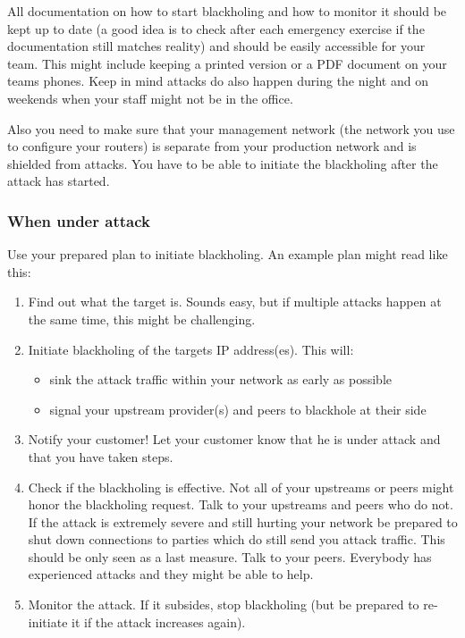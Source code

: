 All documentation on how to start blackholing and how to monitor it should be kept up to date (a good idea is to check after each emergency exercise if the documentation still matches reality) and should be easily accessible for your team. This might include keeping a printed version or a PDF document on your teams phones. Keep in mind attacks do also happen during the night and on weekends when your staff might not be in the office.

Also you need to make sure that your management network (the network you use to configure your routers) is separate from your production network and is shielded from attacks. You have to be able to initiate the blackholing after the attack has started.

\subsubsection{When under attack}
Use your prepared plan to initiate blackholing. An example plan might read like this:
\begin{enumerate}
\item Find out what the target is. Sounds easy, but if multiple attacks happen at the same time, this might be challenging.
\item Initiate blackholing of the targets IP address(es). This will:
\begin{itemize}
  \item sink the attack traffic within your network as early as possible
  \item signal your upstream provider(s) and peers to blackhole at their side
\end{itemize}
\item Notify your customer! Let your customer know that he is under attack and that you have taken steps.
\item Check if the blackholing is effective. Not all of your upstreams or peers might honor the blackholing request. Talk to your upstreams and peers who do not. If the attack is extremely severe and still hurting your network be prepared to shut down connections to parties which do still send you attack traffic. This should be only seen as a last measure. Talk to your peers. Everybody has experienced attacks and they might be able to help.
\item Monitor the attack. If it subsides, stop blackholing (but be prepared to re-initiate it if the attack increases again).
\end{enumerate}
